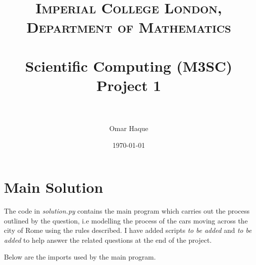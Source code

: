 \documentclass[paper=a4, fontsize=12pt]{scrartcl} %
\title{
\normalfont \normalsize
\textsc{Imperial College London, Department of Mathematics} \\ [25pt]
\horrule{0.5pt} \\[0.4cm]                      %
\huge Scientific Computing (M3SC) Project 1 \\           %
\horrule{2pt} \\[0.5cm]                        %
}
\author{Omar Haque}
\date{\normalsize\today}
\numberwithin{equation}{section}       %
\numberwithin{figure}{section}         %
\numberwithin{table}{section}          %
\begin{document}

\maketitle

\section{Main Solution}

The code in \textit{solution.py} contains the main program which carries out the process outlined by the question, i.e modelling the process of the cars moving across the city of Rome using the rules described. I have added scripts \textit{to be added} and \textit{to be added} to help answer the related questions at the end of the project.
\newline

Below are the imports used by the main program.
\end{document}

